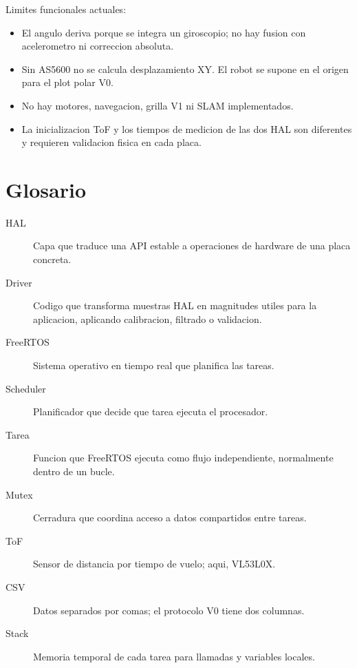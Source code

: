 \documentclass[11pt,a4paper]{article}
\begin{document}
Limites funcionales actuales:

\begin{itemize}
  \item El angulo deriva porque se integra un giroscopio; no hay fusion con
        acelerometro ni correccion absoluta.
  \item Sin AS5600 no se calcula desplazamiento XY. El robot se supone en el
        origen para el plot polar V0.
  \item No hay motores, navegacion, grilla V1 ni SLAM implementados.
  \item La inicializacion ToF y los tiempos de medicion de las dos HAL son
        diferentes y requieren validacion fisica en cada placa.
\end{itemize}

\section{Glosario}

\begin{description}
  \item[HAL] Capa que traduce una API estable a operaciones de hardware de una
        placa concreta.
  \item[Driver] Codigo que transforma muestras HAL en magnitudes utiles para
        la aplicacion, aplicando calibracion, filtrado o validacion.
  \item[FreeRTOS] Sistema operativo en tiempo real que planifica las tareas.
  \item[Scheduler] Planificador que decide que tarea ejecuta el procesador.
  \item[Tarea] Funcion que FreeRTOS ejecuta como flujo independiente, normalmente
        dentro de un bucle.
  \item[Mutex] Cerradura que coordina acceso a datos compartidos entre tareas.
  \item[ToF] Sensor de distancia por tiempo de vuelo; aqui, VL53L0X.
  \item[CSV] Datos separados por comas; el protocolo V0 tiene dos columnas.
  \item[Stack] Memoria temporal de cada tarea para llamadas y variables locales.
\end{description}

\end{document}
